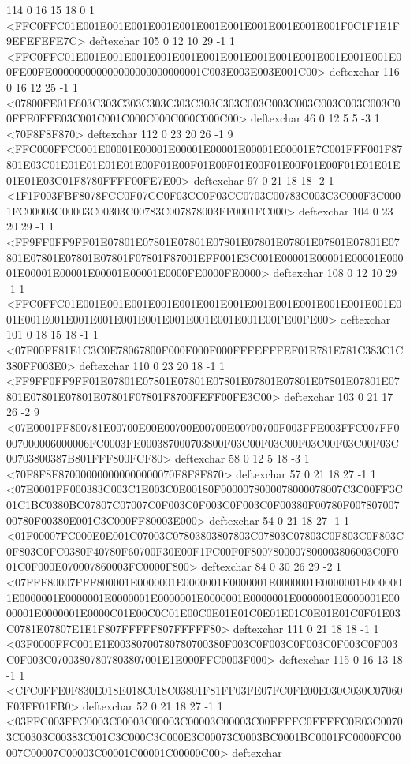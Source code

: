 114 0 16 15 18 0 1 {{<FFC0FFC01E001E001E001E001E001E001E001E001E001E001E001F0C1F1E1F9EFEFEFE7C>}} deftexchar
105 0 12 10 29 -1 1 {{<FFC0FFC01E001E001E001E001E001E001E001E001E001E001E001E001E001E00FE00FE000000000000000000000000001C003E003E003E001C00>}} deftexchar
116 0 16 12 25 -1 1 {{<07800FE01E603C303C303C303C303C303C303C003C003C003C003C003C003C00FFE0FFE03C001C001C000C000C000C000C00>}} deftexchar
46 0 12 5 5 -3 1 {{<70F8F8F870>}} deftexchar
112 0 23 20 26 -1 9 {{<FFC000FFC0001E00001E00001E00001E00001E00001E00001E7C001FFF001F87801E03C01E01E01E01E01E00F01E00F01E00F01E00F01E00F01E00F01E01E01E01E01E03C01F8780FFFF00FE7E00>}} deftexchar
97 0 21 18 18 -2 1 {{<1F1F003FBF8078FCC0F07CC0F03CC0F03CC0703C00783C003C3C000F3C0001FC00003C00003C00303C00783C007878003FF0001FC000>}} deftexchar
104 0 23 20 29 -1 1 {{<FF9FF0FF9FF01E07801E07801E07801E07801E07801E07801E07801E07801E07801E07801E07801E07801F07801F87001EFF001E3C001E00001E00001E00001E00001E00001E00001E00001E00001E0000FE0000FE0000>}} deftexchar
108 0 12 10 29 -1 1 {{<FFC0FFC01E001E001E001E001E001E001E001E001E001E001E001E001E001E001E001E001E001E001E001E001E001E001E001E001E00FE00FE00>}} deftexchar
101 0 18 15 18 -1 1 {{<07F00FF81E1C3C0E78067800F000F000F000FFFEFFFEF01E781E781C383C1C380FF003E0>}} deftexchar
110 0 23 20 18 -1 1 {{<FF9FF0FF9FF01E07801E07801E07801E07801E07801E07801E07801E07801E07801E07801E07801E07801F07801F8700FEFF00FE3C00>}} deftexchar
103 0 21 17 26 -2 9 {{<07E0001FF800781E00700E00E00700E00700E00700700F003FFE003FFC007FF0007000006000006FC0003FE000387000703800F03C00F03C00F03C00F03C00F03C00703800387B801FFF800FCF80>}} deftexchar
58 0 12 5 18 -3 1 {{<70F8F8F870000000000000000070F8F8F870>}} deftexchar
57 0 21 18 27 -1 1 {{<07E0001FF000383C003C1E003C0E00180F0000078000078000078007C3C00FF3C01C1BC0380BC07807C07007C0F003C0F003C0F003C0F00380F00780F00780700700780F00380E001C3C000FF80003E000>}} deftexchar
54 0 21 18 27 -1 1 {{<01F00007FC000E0E001C07003C07803803807803C07803C07803C0F803C0F803C0F803C0FC0380F40780F60700F30E00F1FC00F0F8007800007800003806003C0F001C0F000E070007860003FC0000F800>}} deftexchar
84 0 30 26 29 -2 1 {{<07FFF80007FFF800001E0000001E0000001E0000001E0000001E0000001E0000001E0000001E0000001E0000001E0000001E0000001E0000001E0000001E0000001E0000001E0000001E0000C01E00C0C01E00C0E01E01C0E01E01C0E01E01C0F01E03C0781E07807E1E1F807FFFFF807FFFFF80>}} deftexchar
111 0 21 18 18 -1 1 {{<03F0000FFC001E1E00380700780780700380F003C0F003C0F003C0F003C0F003C0F003C07003807807803807001E1E000FFC0003F000>}} deftexchar
115 0 16 13 18 -1 1 {{<CFC0FFE0F830E018E018C018C03801F81FF03FE07FC0FE00E030C030C07060F03FF01FB0>}} deftexchar
52 0 21 18 27 -1 1 {{<03FFC003FFC0003C00003C00003C00003C00003C00FFFFC0FFFFC0E03C00703C00303C00383C001C3C000C3C000E3C00073C0003BC0001BC0001FC0000FC00007C00007C00003C00001C00001C00000C00>}} deftexchar
